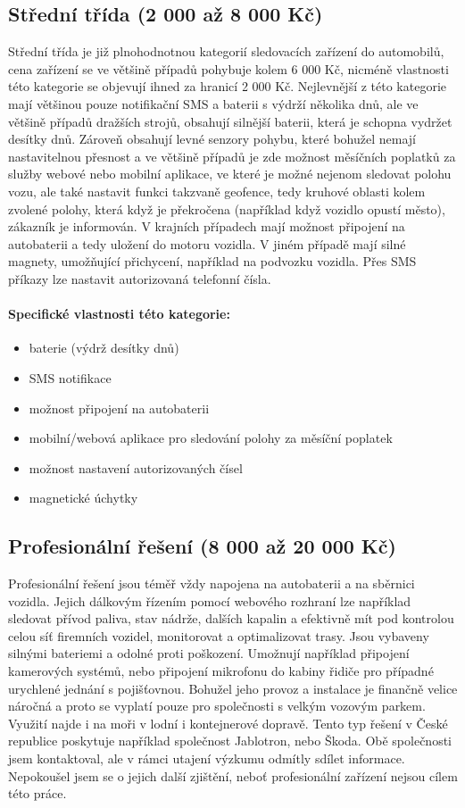 \documentclass[FM,BP]{tulthesis}  %
\begin{document}
\subsection{Střední třída (2 000 až 8 000 Kč)}
Střední třída je již plnohodnotnou kategorií sledovacích zařízení do automobilů, cena zařízení se ve většině případů pohybuje kolem 6 000 Kč, nicméně vlastnosti této kategorie se objevují ihned za hranicí 2 000 Kč. Nejlevnější z této kategorie mají většinou pouze notifikační SMS a baterii s výdrží několika dnů, ale ve většině případů dražších strojů, obsahují silnější baterii, která je schopna vydržet desítky dnů. Zároveň obsahují levné senzory pohybu, které bohužel nemají nastavitelnou přesnost a ve většině případů je zde možnost měsíčních poplatků za služby webové nebo mobilní aplikace, ve které je možné nejenom sledovat polohu vozu, ale také nastavit funkci takzvaně geofence, tedy kruhové oblasti kolem zvolené polohy, která když je překročena (například když vozidlo opustí město), zákazník je informován. V krajních případech mají možnost připojení na autobaterii a tedy uložení do motoru vozidla. V jiném případě mají silné magnety, umožňující přichycení, například na podvozku vozidla. Přes SMS příkazy lze nastavit autorizovaná telefonní čísla.

\paragraph{Specifické vlastnosti této kategorie:}
\begin{itemize}
\item baterie (výdrž desítky dnů)
\item SMS notifikace
\item možnost připojení na autobaterii
\item mobilní/webová aplikace pro sledování polohy za měsíční poplatek
\item možnost nastavení autorizovaných čísel
\item magnetické úchytky
\end{itemize}

\subsection{Profesionální řešení (8 000 až 20 000 Kč)}
Profesionální řešení jsou téměř vždy napojena na autobaterii a na sběrnici vozidla. Jejich dálkovým řízením pomocí webového rozhraní lze například sledovat přívod paliva, stav nádrže, dalších kapalin a efektivně mít pod kontrolou celou síť firemních vozidel, monitorovat a optimalizovat trasy. Jsou vybaveny silnými bateriemi a odolné proti poškození. Umožnují například připojení kamerových systémů, nebo připojení mikrofonu do kabiny řidiče pro případné urychlené jednání s pojišťovnou. Bohužel jeho provoz a instalace je finančně velice náročná a proto se vyplatí pouze pro společnosti s velkým vozovým parkem. Využití najde i na moři v lodní i kontejnerové dopravě. Tento typ řešení v České republice poskytuje například společnost Jablotron, nebo Škoda. Obě společnosti jsem kontaktoval, ale v rámci utajení výzkumu odmítly sdílet informace. Nepokoušel jsem se o jejich další zjištění, neboť profesionální zařízení nejsou cílem této práce. 
\end{document}
